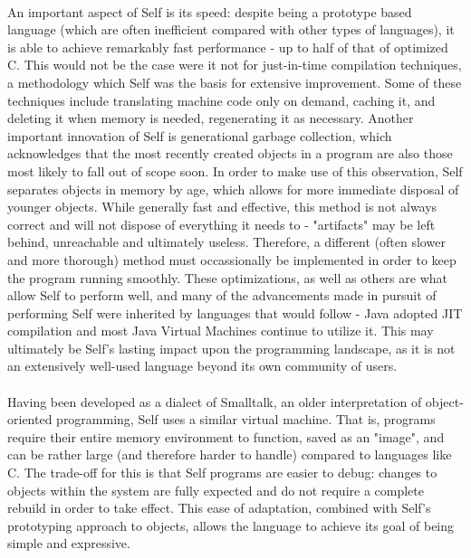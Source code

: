 \documentclass[12pt]{article}
\begin{document}
\paragraph{} An important aspect of Self is its speed: despite being a prototype based language (which are often inefficient compared with other types of languages), it is able to achieve remarkably fast performance - up to half of that of optimized C. This would not be the case were it not for just-in-time compilation techniques, a methodology which Self was the basis for extensive improvement. Some of these techniques include translating machine code only on demand, caching it, and deleting it when memory is needed, regenerating it as necessary. Another important innovation of Self is generational garbage collection, which acknowledges that the most recently created objects in a program are also those most likely to fall out of scope soon. In order to make use of this observation, Self separates objects in memory by age, which allows for more immediate disposal of younger objects. While generally fast and effective, this method is not always correct and will not dispose of everything it needs to - "artifacts" may be left behind, unreachable and ultimately useless. Therefore, a different (often slower and more thorough) method must occassionally be implemented in order to keep the program running smoothly. These optimizations, as well as others are what allow Self to perform well, and many of the advancements made in pursuit of performing Self were inherited by languages that would follow - Java adopted JIT compilation and most Java Virtual Machines continue to utilize it. This may ultimately be Self's lasting impact upon the programming landscape, as it is not an extensively well-used language beyond its own community of users. 

\paragraph{} Having been developed as a dialect of Smalltalk, an older interpretation of object-oriented programming, Self uses a similar virtual machine. That is, programs require their entire memory environment to function, saved as an "image", and can be rather large (and therefore harder to handle) compared to languages like C. The trade-off for this is that Self programs are easier to debug: changes to objects within the system are fully expected and do not require a complete rebuild in order to take effect. This ease of adaptation, combined with Self's prototyping approach to objects, allows the language to achieve its goal of being simple and expressive. 
\end{document}
